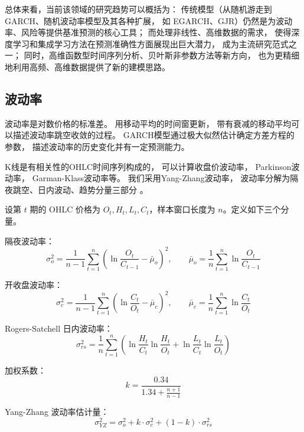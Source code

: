 \documentclass[a4paper,10pt]{article}
\begin{document}
总体来看，当前该领域的研究趋势可以概括为：
传统模型（从随机游走到 GARCH、随机波动率模型及其各种扩展，
如 EGARCH、GJR）仍然是为波动率、风险等提供基准预测的核心工具；
而处理非线性、高维数据的需求，
使得深度学习和集成学习方法在预测准确性方面展现出巨大潜力，
成为主流研究范式之一；
同时，高维函数型时间序列分析、贝叶斯非参数方法等新方向，
也为更精细地利用高频、高维数据提供了新的建模思路。

\subsection{波动率}

波动率是对数价格的标准差。
用移动平均的时间窗更新，
带有衰减的移动平均可以描述波动率跳空收敛的过程。
GARCH模型通过极大似然估计确定方差方程的参数，
描述波动率的历史变化并有一定预测能力。

K线是有相关性的OHLC时间序列构成的，
可以计算收盘价波动率，
Parkinson波动率，
Garman-Klass波动率等。
我们采用Yang-Zhang波动率，
波动率分解为隔夜跳空、日内波动、趋势分量三部分
\cite{YangZhang2000Volatility}。

设第 $t$ 期的 OHLC 价格为 $O_t, H_t, L_t, C_t$，样本窗口长度为 $n$。定义如下三个分量。

隔夜波动率：
\begin{equation}
\sigma_o^2 = \frac{1}{n-1} \sum_{t=1}^{n} \left( \ln \frac{O_t}{C_{t-1}} - \bar{\mu}_o \right)^2, \qquad
\bar{\mu}_o = \frac{1}{n} \sum_{t=1}^{n} \ln \frac{O_t}{C_{t-1}}
\end{equation}

开收盘波动率：
\begin{equation}
\sigma_c^2 = \frac{1}{n-1} \sum_{t=1}^{n} \left( \ln \frac{C_t}{O_t} - \bar{\mu}_c \right)^2, \qquad
\bar{\mu}_c = \frac{1}{n} \sum_{t=1}^{n} \ln \frac{C_t}{O_t}
\end{equation}

Rogers-Satchell 日内波动率：
\begin{equation}
\sigma_{rs}^2 = \frac{1}{n} \sum_{t=1}^{n} \left( \ln \frac{H_t}{C_t} \ln \frac{H_t}{O_t} + \ln \frac{L_t}{C_t} \ln \frac{L_t}{O_t} \right)
\end{equation}

加权系数：
\begin{equation}
k = \frac{0.34}{1.34 + \frac{n+1}{n-1}}
\end{equation}

Yang-Zhang 波动率估计量：
\begin{equation}
\sigma_{YZ}^2 = \sigma_o^2 + k \cdot \sigma_c^2 + (1-k) \cdot \sigma_{rs}^2
\end{equation}
\end{document}
